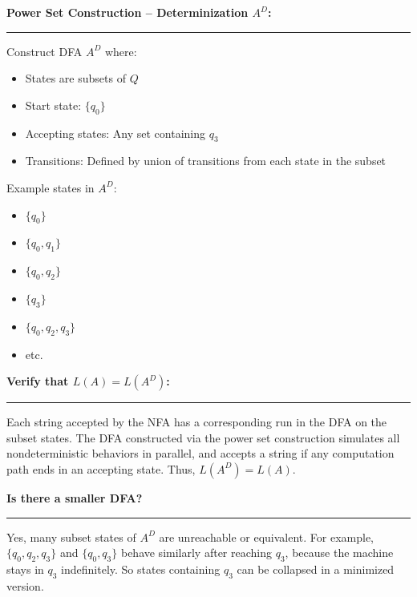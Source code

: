 \documentclass{article}
\theoremstyle{theorem}
\theoremstyle{definition}
\theoremstyle{remark}
\begin{document}
\vspace{1em}
\textbf{Power Set Construction – Determinization \( A^D \):}

\vspace{0.5em}
\hrule
\vspace{0.5em}

Construct DFA \( A^D \) where:
\begin{itemize}
    \item States are subsets of \( Q \)
    \item Start state: \( \{ q_0 \} \)
    \item Accepting states: Any set containing \( q_3 \)
    \item Transitions: Defined by union of transitions from each state in the subset
\end{itemize}

Example states in \( A^D \):
\begin{itemize}
    \item \( \{ q_0 \} \)
    \item \( \{ q_0, q_1 \} \)
    \item \( \{ q_0, q_2 \} \)
    \item \( \{ q_3 \} \)
    \item \( \{ q_0, q_2, q_3 \} \)
    \item etc.
\end{itemize}

\vspace{0.5em}
\textbf{Verify that \( L(A) = L(A^D) \):}  
\vspace{0.5em}
\hrule
\vspace{0.5em}
Each string accepted by the NFA has a corresponding run in the DFA on the subset states. The DFA constructed via the power set construction simulates all nondeterministic behaviors in parallel, and accepts a string if any computation path ends in an accepting state.  
Thus, \( L(A^D) = L(A) \).

\vspace{1em}
\textbf{Is there a smaller DFA?}  
\vspace{0.5em}
\hrule
\vspace{0.5em}
Yes, many subset states of \( A^D \) are unreachable or equivalent. For example, \( \{ q_0, q_2, q_3 \} \) and \( \{ q_0, q_3 \} \) behave similarly after reaching \( q_3 \), because the machine stays in \( q_3 \) indefinitely. So states containing \( q_3 \) can be collapsed in a minimized version.

 \vspace{1em}
 
\end{document}
